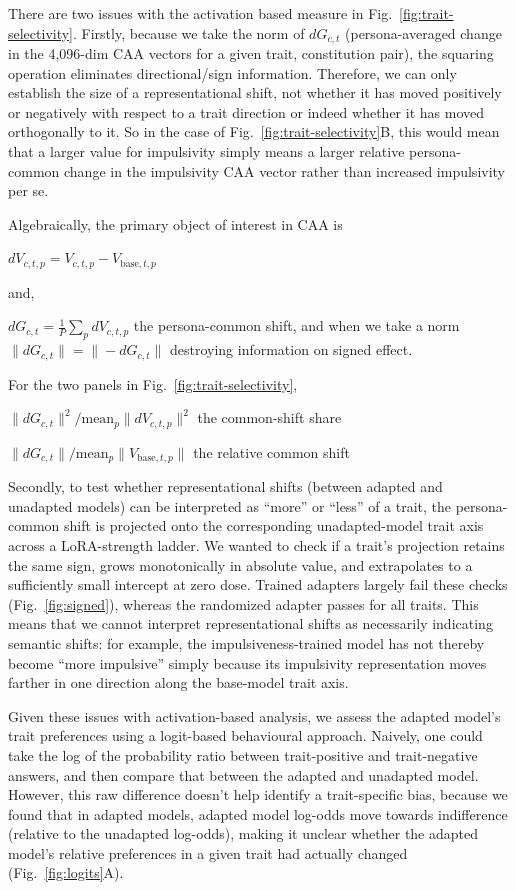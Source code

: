\documentclass{article}
\begin{document}
There are two issues with the activation based measure in Fig.~\ref{fig:trait-selectivity}. Firstly, because we take the norm of $dG_{c,t}$ (persona-averaged change in the 4,096-dim CAA vectors for a given trait, constitution pair), the squaring operation eliminates directional/sign information. Therefore, we can only establish the size of a representational shift, not whether it has moved positively or negatively with respect to a trait direction or indeed whether it has moved orthogonally to it. So in the case of Fig.~\ref{fig:trait-selectivity}B, this would mean that a larger value for impulsivity simply means a larger relative persona-common change in the impulsivity CAA vector rather than increased impulsivity per se.

Algebraically, the primary object of interest in CAA is

$dV_{c,t,p} = V_{c,t,p}-V_{\mathrm{base},t,p}$ 

and,

$dG_{c,t} = \tfrac{1}{P}\sum_{p}dV_{c,t,p}$ the persona-common shift, and when we take a norm $\|dG_{c,t}\| = \|-dG_{c,t}\|$ destroying information on signed effect.

For the two panels in Fig.~\ref{fig:trait-selectivity},

$\|dG_{c,t}\|^2\big/\mathrm{mean}_p\|dV_{c,t,p}\|^2$ the common-shift share

$\|dG_{c,t}\|\big/\mathrm{mean}_p\|V_{\mathrm{base},t,p}\|$ the relative common shift

Secondly, to test whether representational shifts (between adapted and unadapted models) can be interpreted as “more” or “less” of a trait, the persona-common shift is projected onto the corresponding unadapted-model trait axis across a LoRA-strength ladder. We wanted to check if a trait's projection retains the same sign, grows monotonically in absolute value, and extrapolates to a sufficiently small intercept at zero dose. Trained adapters largely fail these checks (Fig.~\ref{fig:signed}), whereas the randomized adapter passes for all traits. This means that we cannot interpret representational shifts as necessarily indicating semantic shifts: for example, the impulsiveness-trained model has not thereby become “more impulsive” simply because its impulsivity representation moves farther in one direction along the base-model trait axis.  

Given these issues with activation-based analysis, we assess the adapted model's trait preferences using a logit-based behavioural approach. Naively, one could take the log of the probability ratio between trait-positive and trait-negative answers, and then compare that between the adapted and unadapted model. However, this raw difference doesn't help identify a trait-specific bias, because we found that in adapted models, adapted model log-odds move towards indifference (relative to the unadapted log-odds), making it unclear whether the adapted model's relative preferences in a given trait had actually changed (Fig.~\ref{fig:logits}A). 
\end{document}
